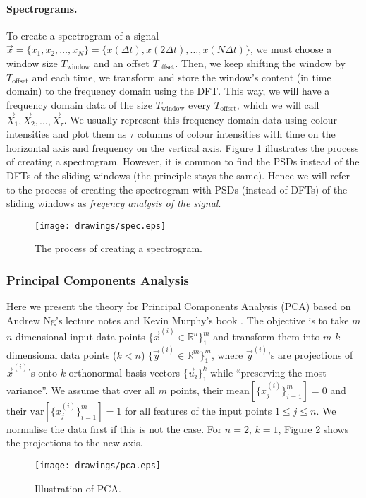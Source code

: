 		\paragraph{Spectrograms.}
			To create a spectrogram of a signal $\vec x = \{x_1, x_2, \dotsc, x_N\} = \{x(\Delta t), x(2\Delta t), \dotsc, x(N\Delta t)\}$, we must choose a window size $T_\text{window}$ and an offset $T_\text{offset}$. Then, we keep shifting the window by $T_\text{offset}$ and each time, we transform and store the window's content (in time domain) to the frequency domain using the DFT. This way, we will have a frequency domain data of the size $T_\text{window}$ every $T_\text{offset}$, which we will call $\vec X_1, \vec X_2, \dotsc, \vec X_\tau$. We usually represent this frequency domain data using colour intensities and plot them as $\tau$ columns of colour intensities with time on the horizontal axis and frequency on the vertical axis. Figure \ref{fig:spec} illustrates the process of creating a spectrogram. However, it is common to find the PSDs instead of the DFTs of the sliding windows (the principle stays the same). Hence we will refer to the process of creating the spectrogram with PSDs (instead of DFTs) of the sliding windows as \emph{freqency analysis of the signal}.
			\begin{figure}[h!]
				\centering
					\texttt{[image: drawings/spec.eps]}
				\caption{The process of creating a spectrogram.}
				\label{fig:spec}
			\end{figure}

	\subsubsection{Principal Components Analysis}
		Here we present the theory for Principal Components Analysis (PCA) based on Andrew Ng's lecture notes \cite{ng13} and Kevin Murphy's book \cite{mlBook}. The objective is to take $m$ $n$-dimensional input data points $\{\vec x^{(i)} \in \mathbb{R}^n\}_1^m$ and transform them into $m$ $k$-dimensional data points ($k<n$) $\{\vec y^{(i)} \in \mathbb{R}^m\}_1^m$, where $\vec y^{(i)}$'s are projections of $\vec x^{(i)}$'s onto $k$ orthonormal basis vectors $\{\vec u_i\}_1^k$ while ``preserving the most variance''. We assume that over all $m$ points, their $\text{mean}\left[\{x^{(i)}_j\}_{i = 1}^m\right] = 0$ and their $\text{var}\left[\{x^{(i)}_j\}_{i = 1}^m\right] = 1$ for all features of the input points $1 \leq j \leq n$. We normalise the data first if this is not the case. For $n = 2$, $k = 1$, Figure \ref{fig:pca} shows the projections to the new axis.
		\begin{figure}[h!]
			\centering
				\texttt{[image: drawings/pca.eps]}
			\caption{Illustration of PCA.}
			\label{fig:pca}
		\end{figure}

